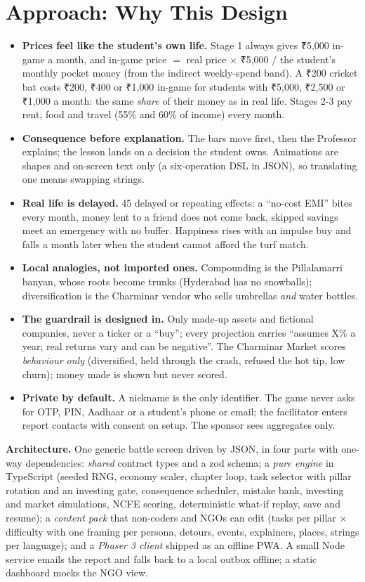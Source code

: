 \documentclass[10pt,a4paper]{article}
\newcommand{\rs}{{\rupeefont ₹}}
\begin{document}
\section{Approach: Why This Design}
\begin{itemize}
  \item \textbf{Prices feel like the student's own life.} Stage 1 always gives \rs5{,}000 in-game a month, and in-game price $=$ real price $\times$ \rs5{,}000 $/$ the student's monthly pocket money (from the indirect weekly-spend band). A \rs200 cricket bat costs \rs200, \rs400 or \rs1{,}000 in-game for students with \rs5{,}000, \rs2{,}500 or \rs1{,}000 a month: the same \emph{share} of their money as in real life. Stages 2-3 pay rent, food and travel (55\% and 60\% of income) every month.
  \item \textbf{Consequence before explanation.} The bars move first, then the Professor explains; the lesson lands on a decision the student owns. Animations are shapes and on-screen text only (a six-operation DSL in JSON), so translating one means swapping strings.
  \item \textbf{Real life is delayed.} 45 delayed or repeating effects: a ``no-cost EMI'' bites every month, money lent to a friend does not come back, skipped savings meet an emergency with no buffer. Happiness rises with an impulse buy and falls a month later when the student cannot afford the turf match.
  \item \textbf{Local analogies, not imported ones.} Compounding is the Pillalamarri banyan, whose roots become trunks (Hyderabad has no snowballs); diversification is the Charminar vendor who sells umbrellas \emph{and} water bottles.
  \item \textbf{The guardrail is designed in.} Only made-up assets and fictional companies, never a ticker or a ``buy''; every projection carries ``assumes X\% a year; real returns vary and can be negative''. The Charminar Market scores \emph{behaviour only} (diversified, held through the crash, refused the hot tip, low churn); money made is shown but never scored.
  \item \textbf{Private by default.} A nickname is the only identifier. The game never asks for OTP, PIN, Aadhaar or a student's phone or email; the facilitator enters report contacts with consent on setup. The sponsor sees aggregates only.
\end{itemize}
\textbf{Architecture.} One generic battle screen driven by JSON, in four parts with one-way dependencies: \emph{shared} contract types and a zod schema; a \emph{pure engine} in TypeScript (seeded RNG, economy scaler, chapter loop, task selector with pillar rotation and an investing gate, consequence scheduler, mistake bank, investing and market simulations, NCFE scoring, deterministic what-if replay, save and resume); a \emph{content pack} that non-coders and NGOs can edit (tasks per pillar $\times$ difficulty with one framing per persona, detours, events, explainers, places, strings per language); and a \emph{Phaser 3 client} shipped as an offline PWA. A small Node service emails the report and falls back to a local outbox offline; a static dashboard mocks the NGO view.
\end{document}
